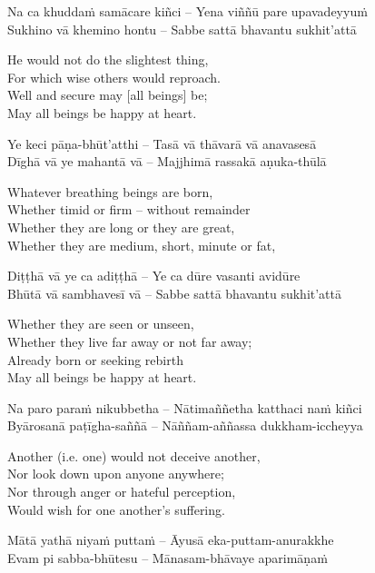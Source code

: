 Na ca khuddaṁ samācare kiñci – Yena viññū pare upavadeyyuṁ\\
Sukhino vā khemino hontu – Sabbe sattā bhavantu sukhit’attā

\begin{english}
  He would not do the slightest thing,\\
  For which wise others would reproach.\\
  Well and secure may [all beings] be;\\
  May all beings be happy at heart.
\end{english}

Ye keci pāṇa-bhūt’atthi – Tasā vā thāvarā vā anavasesā\\
Dīghā vā ye mahantā vā – Majjhimā rassakā aṇuka-thūlā

\begin{english}
  Whatever breathing beings are born,\\
  Whether timid or firm – without remainder\\
  Whether they are long or they are great,\\
  Whether they are medium, short, minute or fat,
\end{english}

Diṭṭhā vā ye ca adiṭṭhā – Ye ca dūre vasanti avidūre\\
Bhūtā vā sambhavesī vā – Sabbe sattā bhavantu sukhit’attā

\begin{english}
  Whether they are seen or unseen,\\
  Whether they live far away or not far away;\\
  Already born or seeking rebirth\\
  May all beings be happy at heart.
\end{english}

Na paro paraṁ nikubbetha – Nātimaññetha katthaci naṁ kiñci\\
Byārosanā paṭīgha-saññā – Nāññam-aññassa dukkham-iccheyya

\begin{english}
  Another (i.e. one) would not deceive another,\\
  Nor look down upon anyone anywhere;\\
  Nor through anger or hateful perception,\\
  Would wish for one another’s suffering.
\end{english}

Mātā yathā niyaṁ puttaṁ – Āyusā eka-puttam-anurakkhe\\
Evam pi sabba-bhūtesu – Mānasam-bhāvaye aparimāṇaṁ

